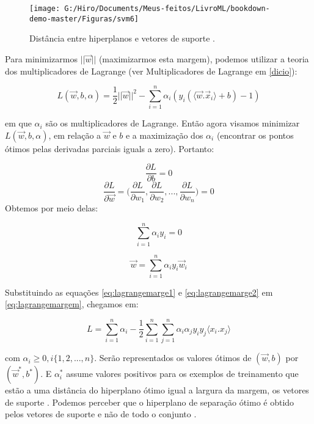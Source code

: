 \documentclass[
  openany]{book}
\begin{document}
\begin{figure}

{\centering \texttt{[image: G:/Hiro/Documents/Meus-feitos/LivroML/bookdown-demo-master/Figuras/svm6]} 

}

\caption{Distância entre hiperplanos e vetores de suporte \citep{gonccalves2015maquina}.}\label{fig:svm6}
\end{figure}



Para minimizarmos \(||\vec{w}||\) (maximizarmos esta margem), podemos utilizar a teoria dos multiplicadores de Lagrange (ver Multiplicadores de Lagrange em \ref{dicio}):

\begin{equation}
L(\vec{w},b,\alpha)=\frac{1}{2}||\vec{w}||^2-\displaystyle \sum^n_{i=1}\alpha_i(y_i(\langle\vec{w}.\vec{x}_i\rangle+b)-1)
\label{eq:lagrangemargem}
\end{equation}

em que \(\alpha_i\) são os multiplicadores de Lagrange. Então agora visamos minimizar \(L(\vec{w},b,\alpha)\), em relação a \(\vec{w}\) e \(b\) e a maximização dos \(\alpha_i\) (encontrar os pontos ótimos pelas derivadas parciais iguals a zero). Portanto:

\[\frac{\partial L}{\partial b}=0\]
\[\frac{\partial L}{\partial \vec{w}}=\bigg(\frac{\partial L}{\partial w_1},\frac{\partial L}{\partial w_2},...,\frac{\partial L}{\partial w_n}\bigg)=0\]
Obtemos por meio delas:

\begin{equation}
\displaystyle \sum^n_{i=1}\alpha_i y_i=0
\label{eq:lagrangemarge1}
\end{equation}

\begin{equation}
\vec{w}=\displaystyle \sum^n_{i=1}\alpha_i y_i \vec{w}_i
\label{eq:lagrangemarge2}
\end{equation}

Substituindo as equações \eqref{eq:lagrangemarge1} e \eqref{eq:lagrangemarge2} em \eqref{eq:lagrangemargem}, chegamos em:

\begin{equation}
L =\displaystyle \sum^n_{i=1}\alpha_i-\frac{1}{2} \displaystyle \sum^n_{i=1}\sum^n_{j=1}\alpha_i\alpha_j y_i y_j \langle x_i.x_j\rangle
\label{eq:lagrangemarge3}
\end{equation}

com \(\alpha_i\geq0,i\{1,2,...,n\}\). Serão representados os valores ótimos de \((\vec{w},b)\) por \((\vec{w}^*,b^*)\). E \(\alpha^*_i\) assume valores positivos para os exemplos de treinamento que estão a uma distância do hiperplano ótimo igual a largura da margem, os vetores de suporte \citep{gonccalves2015maquina}. Podemos perceber que o hiperplano de separação ótimo é obtido pelos vetores de suporte e não de todo o conjunto \citep{lorena2003introduccaoas}.
\end{document}
